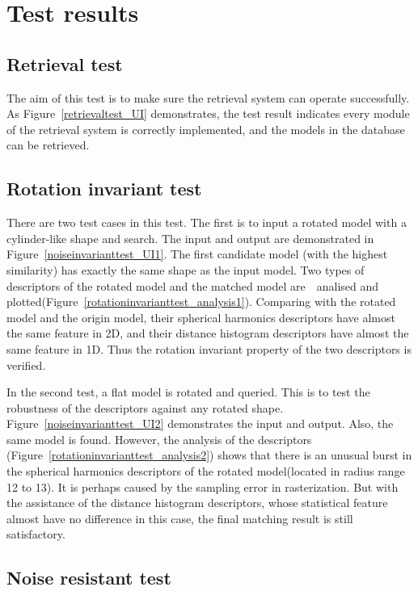 \section{Test results} \label{sec:results}

\subsection{Retrieval test} 

The aim of this test is to make sure the retrieval system can operate successfully. As Figure~\ref{retrievaltest_UI} demonstrates, the test result indicates every module of the retrieval system is correctly implemented, and the models in the database can be retrieved. 

\subsection{Rotation invariant test} \label{sec:results_rotationinvarianttest}

There are two test cases in this test. The first is to input a rotated model with a cylinder-like shape and search. The input and output are demonstrated in Figure~\ref{noiseinvarianttest_UI1}. The first candidate model (with the highest similarity) has exactly the same shape as the input model. Two types of descriptors of the rotated model and the matched model are　analised and plotted(Figure~\ref{rotationinvarianttest_analysis1}). Comparing with the rotated model and the origin model, their spherical harmonics descriptors have almost the same feature in 2D, and their distance histogram descriptors have almost the same feature in 1D. Thus the rotation invariant property of the two descriptors is verified.

In the second test, a flat model is rotated and queried. This is to test the robustness of the descriptors against any rotated shape. Figure~\ref{noiseinvarianttest_UI2} demonstrates the input and output. Also, the same model is found. However, the analysis of the descriptors (Figure~\ref{rotationinvarianttest_analysis2}) shows that there is an unusual burst in the spherical harmonics descriptors of the rotated model(located in radius range 12 to 13). It is perhaps caused by the sampling error in rasterization. But with the assistance of the distance histogram descriptors, whose statistical feature almost have no difference in this case, the final matching result is still satisfactory. 

\subsection{Noise resistant test}

